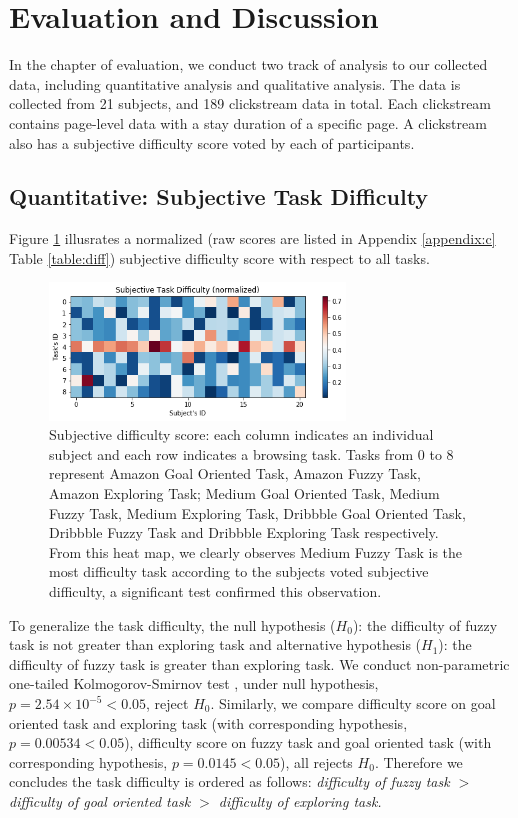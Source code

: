 \section{Evaluation and Discussion}
\label{ch:eval}

In the chapter of evaluation, we conduct two track of analysis to our collected data, including
quantitative analysis and qualitative analysis. The data is collected from 21 subjects, 
and 189 clickstream data in total. Each clickstream contains page-level data with a stay duration
of a specific page. A clickstream also has a subjective difficulty score voted by each 
of participants.

\subsection{Quantitative: Subjective Task Difficulty}

Figure \ref{fig:difficulty} illusrates a normalized (raw scores are listed in 
Appendix \ref{appendix:c} Table \ref{table:diff}) subjective difficulty score 
with respect to all tasks.

\begin{figure}[H]
    \centering
    \includegraphics[width=0.7\textwidth]{figures/difficulty}
    \caption{Subjective difficulty score: each column indicates an individual subject and
    each row indicates a browsing task. Tasks from 0 to 8 represent Amazon Goal Oriented Task,
    Amazon Fuzzy Task, Amazon Exploring Task; Medium Goal Oriented Task, Medium Fuzzy Task,
    Medium Exploring Task, Dribbble Goal Oriented Task, Dribbble Fuzzy Task and Dribbble Exploring Task
    respectively.
    From this heat map, we clearly observes Medium Fuzzy Task is the most difficulty task
    according to the subjects voted subjective difficulty, a significant test confirmed this observation.}
    \label{fig:difficulty}
\end{figure}

To generalize the task difficulty, the null hypothesis ($H_0$): the difficulty of fuzzy task is not greater
than exploring task and alternative hypothesis ($H_1$): the difficulty of fuzzy task is greater than
exploring task. We conduct non-parametric one-tailed Kolmogorov-Smirnov test
\cite{massey1951kolmogorov}, under null hypothesis, $p=2.54\times 10^{-5} < 0.05$, reject $H_0$.
Similarly, we compare difficulty score on goal oriented task and exploring task (with corresponding hypothesis, 
$p=0.00534 < 0.05$), difficulty score on fuzzy task and goal oriented task (with corresponding hypothesis, 
$p=0.0145 < 0.05$), all rejects $H_0$. Therefore we concludes the task difficulty is ordered
as follows: \emph{difficulty of fuzzy task $>$ difficulty of goal oriented task $>$ difficulty of exploring task.}

